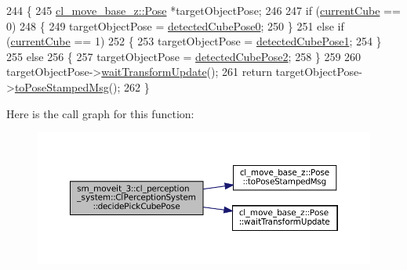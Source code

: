 \begin{DoxyCode}
244   \{
245     \hyperlink{classcl__move__base__z_1_1Pose}{cl\_move\_base\_z::Pose} *targetObjectPose;
246 
247     \textcolor{keywordflow}{if} (\hyperlink{classsm__moveit__3_1_1cl__perception__system_1_1ClPerceptionSystem_ad915fc687481d4157ec40de52f8eaa82}{currentCube} == 0)
248     \{
249       targetObjectPose = \hyperlink{classsm__moveit__3_1_1cl__perception__system_1_1ClPerceptionSystem_a6ac235df679beb12a5b5213bff957440}{detectedCubePose0};
250     \}
251     \textcolor{keywordflow}{else} \textcolor{keywordflow}{if} (\hyperlink{classsm__moveit__3_1_1cl__perception__system_1_1ClPerceptionSystem_ad915fc687481d4157ec40de52f8eaa82}{currentCube} == 1)
252     \{
253       targetObjectPose = \hyperlink{classsm__moveit__3_1_1cl__perception__system_1_1ClPerceptionSystem_a3f1b847b74fdd45ea377b626a7e8a295}{detectedCubePose1};
254     \}
255     \textcolor{keywordflow}{else}
256     \{
257       targetObjectPose = \hyperlink{classsm__moveit__3_1_1cl__perception__system_1_1ClPerceptionSystem_a2bda2a7e60579dd9d19c5b9e8a9dd79e}{detectedCubePose2};
258     \}
259 
260     targetObjectPose->\hyperlink{classcl__move__base__z_1_1Pose_a5f8576c3dacfb2f2e7f9df5105c480ea}{waitTransformUpdate}();
261     \textcolor{keywordflow}{return} targetObjectPose->\hyperlink{classcl__move__base__z_1_1Pose_a63887a88c1ac6e9a4a71b8d7d11aed6c}{toPoseStampedMsg}();
262   \}
\end{DoxyCode}
Here is the call graph for this function\+:
\nopagebreak
\begin{figure}[H]
\begin{center}
\leavevmode
\includegraphics[width=350pt]{classsm__moveit__3_1_1cl__perception__system_1_1ClPerceptionSystem_accc2813b1da308e9a71bec317db4590d_cgraph}
\end{center}
\end{figure}
\mbox{\label{classsm__moveit__3_1_1cl__perception__system_1_1ClPerceptionSystem_a0ee47269c0aacdced77b9bbe9577499d}} 
